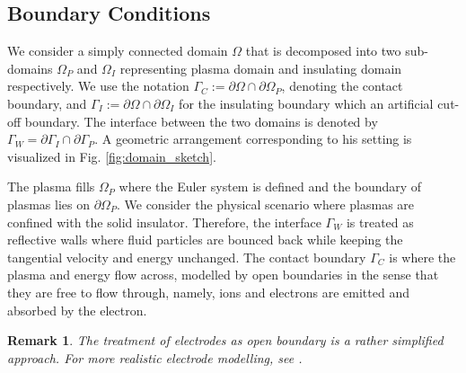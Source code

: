 \documentclass{article}
\newtheorem*{remark}{Remark}
\begin{document}
\subsection{Boundary Conditions} \label{sec:BC}

We consider a simply connected domain $\Omega$ that is decomposed into two sub-domains $\Omega_P$ and $\Omega_I$ representing plasma domain and insulating domain respectively. We use the notation $\Gamma_C := \partial\Omega \cap \partial\Omega_P$, denoting the contact boundary, and $\Gamma_I := \partial\Omega \cap \partial\Omega_I$ for the insulating boundary which an artificial cut-off boundary. The interface between the two domains is denoted by $\Gamma_W = \partial\Gamma_I \cap \partial\Gamma_P$. A geometric arrangement corresponding to his setting is visualized in Fig. \ref{fig:domain_sketch}. 

The plasma fills $\Omega_P$ where the Euler system is defined and the boundary of plasmas lies on $\partial\Omega_P$. We consider the physical scenario where plasmas are confined with the solid insulator. Therefore, the interface $\Gamma_W$ is treated as reflective walls where fluid particles are bounced back while keeping the tangential velocity and energy unchanged. The contact boundary $\Gamma_C$ is where the plasma and energy flow across, modelled by open boundaries in the sense that they are free to flow through, namely, ions and electrons are emitted and absorbed by the electron. 

\begin{remark}
    The treatment of electrodes as open boundary is a rather simplified approach. For more realistic electrode modelling, see \cite{godyak_1990, parker_1993}.
\end{remark}
\end{document}
